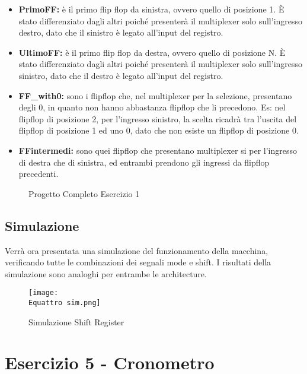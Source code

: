 \documentclass[12pt]{article}
\def \Equattro {Allegati/Esercizio4/}
\begin{document}
\begin{itemize}
    \item \textbf{PrimoFF:} è il primo flip flop da sinistra, ovvero quello di posizione 1. È stato differenziato dagli altri poiché presenterà il multiplexer solo sull’ingresso destro, dato che il sinistro è legato all’input del registro.
    \item \textbf{UltimoFF:} è il primo flip flop da destra, ovvero quello di posizione N. È stato differenziato dagli altri poiché presenterà il multiplexer solo sull’ingresso sinistro, dato che il destro è legato all’input del registro.
    \item \textbf{FF\_with0:} sono i flipflop che, nel multiplexer per la selezione, presentano degli 0, in quanto non hanno abbastanza flipflop che li precedono. Es: nel flipflop di posizione 2, per l’ingresso sinistro, la scelta ricadrà tra l’uscita del flipflop di posizione 1 ed uno 0, dato che non esiste un flipflop di posizione 0.
    \item \textbf{FFintermedi:} sono quei flipflop che presentano multiplexer si per l’ingresso di destra che di sinistra, ed entrambi prendono gli ingressi da flipflop precedenti.
\end{itemize}
\clearpage
\begin{figure}[ht!]
    \centering
    
    \caption{Progetto Completo Esercizio 1}
\end{figure}
\subsection{Simulazione}
Verrà ora presentata una simulazione del funzionamento della macchina, verificando tutte le combinazioni dei segnali mode e shift. I risultati della simulazione sono analoghi per entrambe le architecture.
\begin{figure}[ht]
    \centering
    \texttt{[image: \\Equattro sim.png]}
    \caption{Simulazione Shift Register}
\end{figure}
\newpage
\section{Esercizio 5 - Cronometro}
\end{document}
